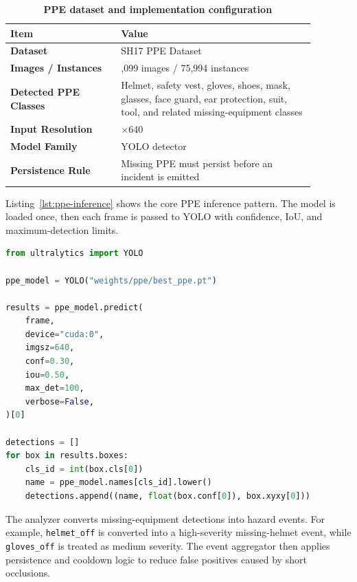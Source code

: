 \begin{table}[H]
\centering
\renewcommand{\arraystretch}{1.45}
\begin{tabular}{|>{\centering\arraybackslash}p{0.32\linewidth}|>{\centering\arraybackslash}p{0.56\linewidth}|}
\hline
\textbf{Item} & \textbf{Value} \\
\hline
\textbf{Dataset} & SH17 PPE Dataset \\
\hline
\textbf{Images / Instances} & 8,099 images / 75,994 instances \\
\hline
\textbf{Detected PPE Classes} & Helmet, safety vest, gloves, shoes, mask, glasses, face guard, ear protection, suit, tool, and related missing-equipment classes \\
\hline
\textbf{Input Resolution} & 640$\times$640 \\
\hline
\textbf{Model Family} & YOLO detector \\
\hline
\textbf{Persistence Rule} & Missing PPE must persist before an incident is emitted \\
\hline
\end{tabular}
\caption{\textbf{PPE dataset and implementation configuration}}
\label{tab:chapter5-ppe-dataset}
\end{table}

Listing~\ref{lst:ppe-inference} shows the core PPE inference pattern. The model is loaded once, then each frame is passed to YOLO with confidence, IoU, and maximum-detection limits.

\begin{lstlisting}[language=Python,caption={PPE model inference on one frame},label={lst:ppe-inference}]
from ultralytics import YOLO

ppe_model = YOLO("weights/ppe/best_ppe.pt")

results = ppe_model.predict(
    frame,
    device="cuda:0",
    imgsz=640,
    conf=0.30,
    iou=0.50,
    max_det=100,
    verbose=False,
)[0]

detections = []
for box in results.boxes:
    cls_id = int(box.cls[0])
    name = ppe_model.names[cls_id].lower()
    detections.append((name, float(box.conf[0]), box.xyxy[0]))
\end{lstlisting}

The analyzer converts missing-equipment detections into hazard events. For example, \texttt{helmet\_off} is converted into a high-severity missing-helmet event, while \texttt{gloves\_off} is treated as medium severity. The event aggregator then applies persistence and cooldown logic to reduce false positives caused by short occlusions.

